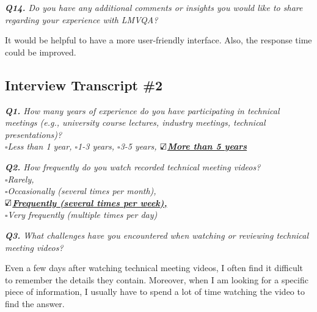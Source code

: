 \vspace*{1em}\noindent\textit{\textbf{Q14.} Do you have any additional comments or insights you would like to share regarding your experience with LMVQA?
}

\begin{samepage}
\begin{mdframed}[style=MyFrame]
It would be helpful to have a more user-friendly interface. Also, the response time could be improved. 
\end{mdframed}
\end{samepage}


\vspace*{.6cm}


\noindent\hrulefill 

\subsection{Interview Transcript \#2}
\label{appendix:transcript2}

\vspace*{.6cm}

\vspace*{1em}\noindent\textit{\textbf{Q1.} How many years of experience do you have participating in technical meetings (e.g., university course lectures, industry meetings, technical presentations)?
\\[.5em]
        \indent $\square$Less than 1 year,
        $\square$1-3 years,
        $\square$3-5 years,
       \underline{\bfseries$\text{\rlap{$\checkmark$}}\square$More than 5 years}
}


\vspace*{1em}\noindent\textit{\textbf{Q2.} How frequently do you watch recorded technical meeting videos?
\\[.5em]
        \indent $\square$Rarely,\\
        \indent$\square$Occasionally (several times per month),\\
        \indent\underline{\bfseries$\text{\rlap{$\checkmark$}}\square$Frequently (several times per week),}\\
        \indent$\square$Very frequently (multiple times per day)
}

\vspace*{1em}\noindent\textit{\textbf{Q3.} What challenges have you encountered when watching or reviewing technical meeting videos? 
}

\begin{samepage}
\begin{mdframed}[style=MyFrame]
Even a few days after watching technical meeting videos, I often find it difficult to remember the details they contain. Moreover, when I am looking for a specific piece of information, I usually have to spend a lot of time watching the video to find the answer.
\end{mdframed}
\end{samepage}

